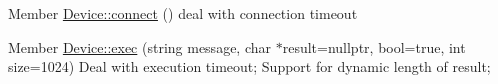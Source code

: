 
\begin{DoxyRefList}
\item[Member \mbox{\hyperlink{class_device_ad2b9f59ad977879bd6314258b2080d27}{Device\+::connect}} ()]\label{todo__todo000001}%
%
deal with connection timeout  
\item[Member \mbox{\hyperlink{class_device_a71749b2f1932378ccf4a31f95e96c619}{Device\+::exec}} (string message, char $\ast$result=nullptr, bool=true, int size=1024)]\label{todo__todo000002}%
%
Deal with execution timeout; Support for dynamic length of result; 
\end{DoxyRefList}
